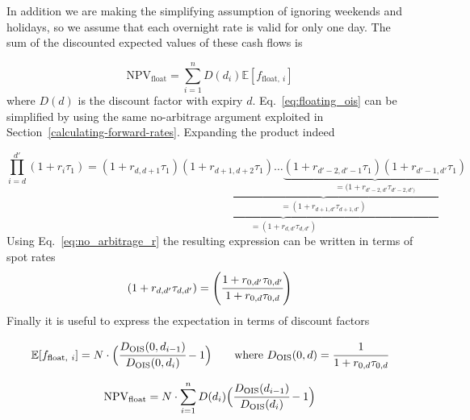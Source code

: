In addition we are making the simplifying assumption of ignoring weekends and holidays, so we assume that each overnight rate is valid for only one day. The sum of the discounted expected values of these cash flows is

\begin{equation}
\mathrm{NPV}_{\mathrm{float}} = \sum_{i=1}^{n}D(d_i)\mathbb{E}[f_{\mathrm{float},~i}]
\end{equation}
where $D(d)$ is the discount factor with expiry $d$. Eq.~\ref{eq:floating_ois} can be simplified by using the same no-arbitrage argument exploited in Section~\ref{calculating-forward-rates}. Expanding the product indeed

\begin{equation*}
\prod_{i=d}^{d'} (1+r_i\tau_1) = \underbrace{(1+r_{d,d+1}\tau_1)\underbrace{(1+r_{d+1,d+2}\tau_1)\ldots\underbrace{(1+r_{d'-2,d'-1}\tau_1)(1+r_{d'-1,d'}\tau_1)}_{\textstyle =(1+r_{d'-2,d'}\tau_{d'-2,d')}}}_{\textstyle =(1+r_{d+1,d'}\tau_{d+1, d'})}}_{\textstyle =(1+r_{d,d'}\tau_{d,d'})}
\end{equation*}
\noindent
Using Eq.~\ref{eq:no_arbitrage_r} the resulting expression can be written in terms of spot rates
\begin{equation*}
(1+r_{d,d'}\tau_{d,d'}) = \left(\cfrac{1+r_{0, d'}\tau_{0,d'}}{1+r_{0,d}\tau_{0,d}}\right)
\end{equation*}
\noindent Finally it is useful to express the expectation in terms of discount factors

\begin{equation*}
\mathbb{E}[f_{\mathrm{float},~i}] = N\cdot\Big(\cfrac{D_{\mathrm{OIS}}(0, d_{i-1})}{D_{\mathrm{OIS}}(0, d_{i})} - 1\Big)\qquad \mathrm{where}\ D_{\mathrm{OIS}}(0,d)=\cfrac{1}{1+r_{0,d}\tau_{0,d}}
\end{equation*}

\begin{equation*}
\mathrm{NPV}_{\mathrm{float}} = N\cdot \sum_{i=1}^{n}D(d_i) \Big(\cfrac{D_{\mathrm{OIS}}(d_{i-1})}{D_{\mathrm{OIS}}(d_{i})} - 1\Big)
\end{equation*}

%


